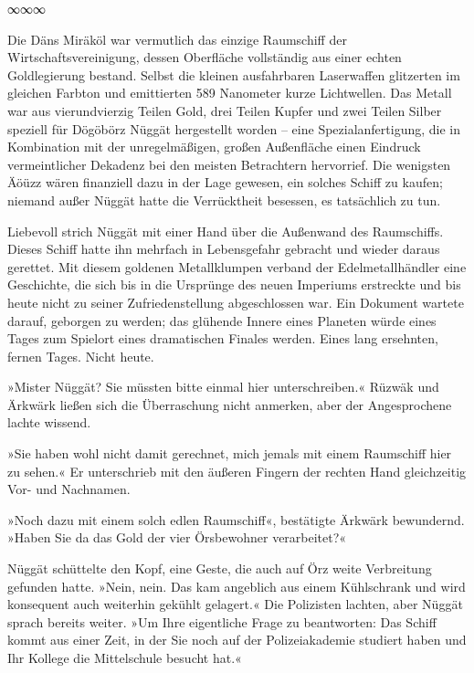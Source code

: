 \begin{center}
∞∞∞
\end{center}

Die Däns Miräköl war vermutlich das einzige Raumschiff der Wirtschaftsvereinigung, dessen Oberfläche vollständig aus einer echten Goldlegierung bestand. Selbst die kleinen ausfahrbaren Laserwaffen glitzerten im gleichen Farbton und emittierten 589 Nanometer kurze Lichtwellen. Das Metall war aus vierundvierzig Teilen Gold, drei Teilen Kupfer und zwei Teilen Silber speziell für Dögöbörz Nüggät hergestellt worden – eine Spezialanfertigung, die in Kombination mit der unregelmäßigen, großen Außenfläche einen Eindruck vermeintlicher Dekadenz bei den meisten Betrachtern hervorrief. Die wenigsten Äöüzz wären finanziell dazu in der Lage gewesen, ein solches Schiff zu kaufen; niemand außer Nüggät hatte die Verrücktheit besessen, es tatsächlich zu tun.

Liebevoll strich Nüggät mit einer Hand über die Außenwand des Raumschiffs. Dieses Schiff hatte ihn mehrfach in Lebensgefahr gebracht und wieder daraus gerettet. Mit diesem goldenen Metallklumpen verband der Edelmetallhändler eine Geschichte, die sich bis in die Ursprünge des neuen Imperiums erstreckte und bis heute nicht zu seiner Zufriedenstellung abgeschlossen war. Ein Dokument wartete darauf, geborgen zu werden; das glühende Innere eines Planeten würde eines Tages zum Spielort eines dramatischen Finales werden. Eines lang ersehnten, fernen Tages. Nicht heute.

»Mister Nüggät? Sie müssten bitte einmal hier unterschreiben.« Rüzwäk und Ärkwärk ließen sich die Überraschung nicht anmerken, aber der Angesprochene lachte wissend.

»Sie haben wohl nicht damit gerechnet, mich jemals mit einem Raumschiff hier zu sehen.« Er unterschrieb mit den äußeren Fingern der rechten Hand gleichzeitig Vor- und Nachnamen.

»Noch dazu mit einem solch edlen Raumschiff«, bestätigte Ärkwärk bewundernd. »Haben Sie da das Gold der vier Örsbewohner verarbeitet?«

Nüggät schüttelte den Kopf, eine Geste, die auch auf Örz weite Verbreitung gefunden hatte. »Nein, nein. Das kam angeblich aus einem Kühlschrank und wird konsequent auch weiterhin gekühlt gelagert.« Die Polizisten lachten, aber Nüggät sprach bereits weiter. »Um Ihre eigentliche Frage zu beantworten: Das Schiff kommt aus einer Zeit, in der Sie noch auf der Polizeiakademie studiert haben und Ihr Kollege die Mittelschule besucht hat.«


